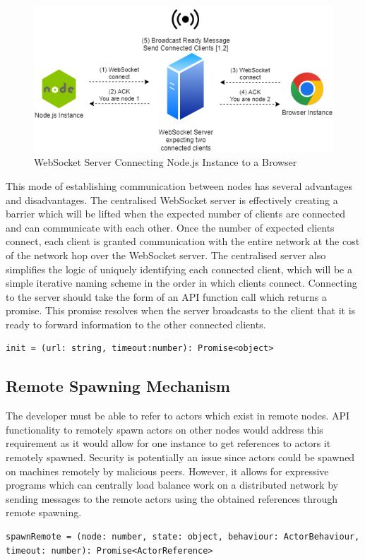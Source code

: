 \documentclass[oneside]{um-fict}
\begin{document}
\begin{figure}[H]
    \begin{centering}
        \includegraphics[width=\textwidth]{resources/websocketconnection.png}
        \caption{WebSocket Server Connecting Node.js Instance to a Browser}\label{fig:websocketconnection}
    \end{centering}
\end{figure}
 
This mode of establishing communication between nodes has several advantages and disadvantages. The centralised WebSocket server is effectively creating a barrier which will be lifted when the expected number of clients are connected and can communicate with each other. Once the number of expected clients connect, each client is granted communication with the entire network at the cost of the network hop over the WebSocket server. The centralised server also simplifies the logic of uniquely identifying each connected client, which will be a simple iterative naming scheme in the order in which clients connect. Connecting to the server should take the form of an API function call which returns a promise. This promise resolves when the server broadcasts to the client that it is ready to forward information to the other connected clients.
\begin{lstlisting}
init = (url: string, timeout:number): Promise<object>
\end{lstlisting}

\subsection{Remote Spawning Mechanism}
The developer must be able to refer to actors which exist in remote nodes. API functionality to remotely spawn actors on other nodes would address this requirement as it would allow for one instance to get references to actors it remotely spawned. Security is potentially an issue since actors could be spawned on machines remotely by malicious peers. However, it allows for expressive programs which can centrally load balance work on a distributed network by sending messages to the remote actors using the obtained references through remote spawning.
\begin{lstlisting}
spawnRemote = (node: number, state: object, behaviour: ActorBehaviour, timeout: number): Promise<ActorReference>
\end{lstlisting}
\end{document}
